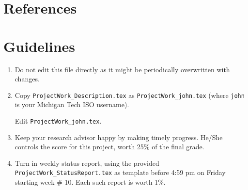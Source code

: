 \documentclass[letterpaper,12pt,fleqn]{article}
\begin{document}
\newpage
{}
\section*{References}


\vfill
\section*{Guidelines}

\begin{enumerate}
  \item Do not edit this file directly as it might be periodically
        overwritten with changes.        
  \item Copy \texttt{ProjectWork\_Description.tex} as
        \texttt{ProjectWork\_john.tex} (where \texttt{john} is your 
        Michigan Tech ISO username).

        Edit \texttt{ProjectWork\_john.tex}.
  \item Keep your research advisor happy by making timely progress. He/She
        controls the score for this project, worth 25\% of the final grade.
  \item Turn in weekly status report, using the provided 
        \texttt{ProjectWork\_StatusReport.tex} as template before 4:59 pm on 
        Friday starting week \# 10. Each such report is worth 1\%.
\end{enumerate}

\end{document}
